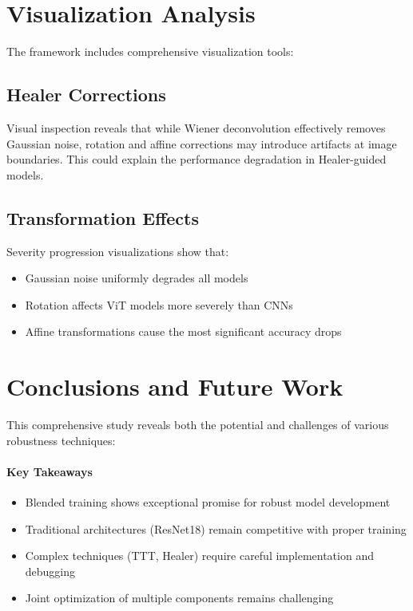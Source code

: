 \documentclass[11pt,a4paper]{article}
\begin{document}
\section{Visualization Analysis}

The framework includes comprehensive visualization tools:

\subsection{Healer Corrections}
Visual inspection reveals that while Wiener deconvolution effectively removes Gaussian noise, rotation and affine corrections may introduce artifacts at image boundaries. This could explain the performance degradation in Healer-guided models.

\subsection{Transformation Effects}
Severity progression visualizations show that:
\begin{itemize}
    \item Gaussian noise uniformly degrades all models
    \item Rotation affects ViT models more severely than CNNs
    \item Affine transformations cause the most significant accuracy drops
\end{itemize}

\section{Conclusions and Future Work}

This comprehensive study reveals both the potential and challenges of various robustness techniques:

\paragraph{Key Takeaways}
\begin{itemize}
    \item Blended training shows exceptional promise for robust model development
    \item Traditional architectures (ResNet18) remain competitive with proper training
    \item Complex techniques (TTT, Healer) require careful implementation and debugging
    \item Joint optimization of multiple components remains challenging
\end{itemize}
\end{document}
